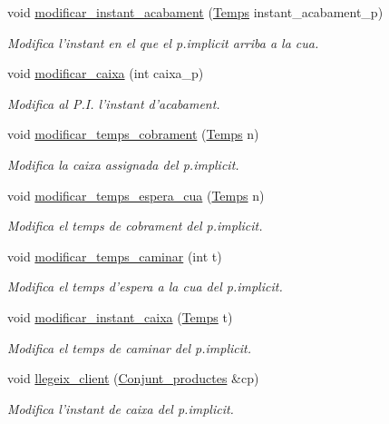 \begin{DoxyCompactItemize}
void \hyperlink{class_client_abb16904da37ead035413d5595889af2f}{modificar\-\_\-instant\-\_\-acabament} (\hyperlink{class_temps}{Temps} instant\-\_\-acabament\-\_\-p)
\begin{DoxyCompactList}\small\item\em Modifica l'instant en el que el p.\-implicit arriba a la cua. \end{DoxyCompactList}\item 
void \hyperlink{class_client_aa3c794239505f1996f1468a542548461}{modificar\-\_\-caixa} (int caixa\-\_\-p)
\begin{DoxyCompactList}\small\item\em Modifica al P.\-I. l'instant d'acabament. \end{DoxyCompactList}\item 
void \hyperlink{class_client_a358215e753f86584d9159d01b66eeded}{modificar\-\_\-temps\-\_\-cobrament} (\hyperlink{class_temps}{Temps} n)
\begin{DoxyCompactList}\small\item\em Modifica la caixa assignada del p.\-implicit. \end{DoxyCompactList}\item 
void \hyperlink{class_client_a8ea63f73665f9384629d2a6ff46bb252}{modificar\-\_\-temps\-\_\-espera\-\_\-cua} (\hyperlink{class_temps}{Temps} n)
\begin{DoxyCompactList}\small\item\em Modifica el temps de cobrament del p.\-implicit. \end{DoxyCompactList}\item 
void \hyperlink{class_client_ab9604d012fe1763e9b26c0579354d7c8}{modificar\-\_\-temps\-\_\-caminar} (int t)
\begin{DoxyCompactList}\small\item\em Modifica el temps d'espera a la cua del p.\-implicit. \end{DoxyCompactList}\item 
void \hyperlink{class_client_a1718ce0ec5713509921963aaa48f6417}{modificar\-\_\-instant\-\_\-caixa} (\hyperlink{class_temps}{Temps} t)
\begin{DoxyCompactList}\small\item\em Modifica el temps de caminar del p.\-implicit. \end{DoxyCompactList}\item 
void \hyperlink{class_client_a7aa5563129732582a21cefb39fa88e9e}{llegeix\-\_\-client} (\hyperlink{class_conjunt__productes}{Conjunt\-\_\-productes} \&cp)
\begin{DoxyCompactList}\small\item\em Modifica l'instant de caixa del p.\-implicit. \end{DoxyCompactList}\item 

\end{DoxyCompactItemize}
